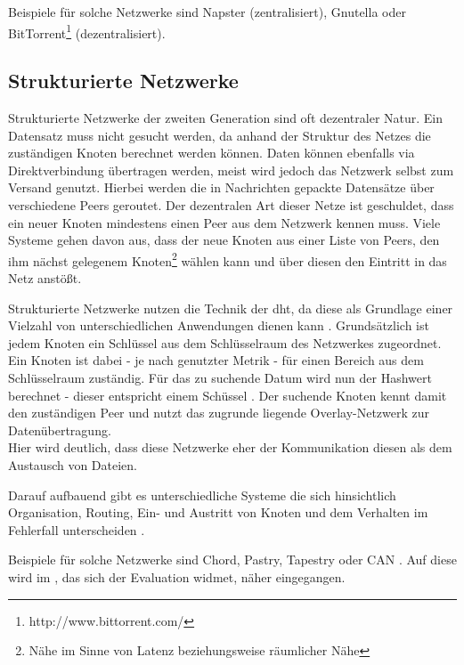 Beispiele für solche Netzwerke sind Napster (zentralisiert), Gnutella oder BitTorrent\footnote{http://www.bittorrent.com/} (dezentralisiert).

\subsection{Strukturierte Netzwerke}
Strukturierte Netzwerke der zweiten Generation sind oft dezentraler Natur. Ein Datensatz muss nicht gesucht werden, da anhand der Struktur des Netzes die zuständigen Knoten berechnet werden können. Daten können ebenfalls via Direktverbindung übertragen werden, meist wird jedoch das Netzwerk selbst zum Versand genutzt. Hierbei werden die in Nachrichten gepackte Datensätze über verschiedene Peers geroutet. Der dezentralen Art dieser Netze ist geschuldet, dass ein neuer Knoten mindestens einen Peer aus dem Netzwerk kennen muss. Viele Systeme gehen davon aus, dass der neue Knoten aus einer Liste von Peers, den ihm nächst gelegenem Knoten\footnote{Nähe im Sinne von Latenz beziehungsweise räumlicher Nähe} wählen kann und über diesen den Eintritt in das Netz anstößt.

Strukturierte Netzwerke nutzen die Technik der \ac{dht}, da diese als Grundlage einer Vielzahl von unterschiedlichen Anwendungen dienen kann \cite{Wehrle2005, Ghodsi2006AlgorithmsDHT}. Grundsätzlich ist jedem Knoten ein Schlüssel aus dem Schlüsselraum des Netzwerkes zugeordnet. Ein Knoten ist dabei - je nach genutzter Metrik - für einen Bereich aus dem Schlüsselraum zuständig. Für das zu suchende Datum wird nun der Hashwert berechnet - dieser entspricht einem Schüssel \cite{BalakrishnanLooking}. Der suchende Knoten kennt damit den zuständigen Peer und nutzt das zugrunde liegende Overlay-Netzwerk zur Datenübertragung.\\
Hier wird deutlich, dass diese Netzwerke eher der Kommunikation diesen als dem Austausch von Dateien.

Darauf aufbauend gibt es unterschiedliche Systeme die sich hinsichtlich Organisation, Routing, Ein- und Austritt von Knoten und dem Verhalten im Fehlerfall unterscheiden \cite{Goetz2005, Lua2005Survey}.

Beispiele für solche Netzwerke sind Chord, Pastry, Tapestry oder CAN \cite{Hosseini2007Survey, Rowstron2001, Zhao2001Tapestry,Zhao2004Tapestry, Ratnasamy2001Scalable}. Auf diese wird im , das sich der Evaluation widmet, näher eingegangen.
